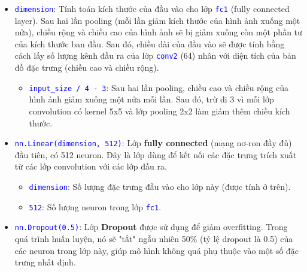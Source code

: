 \begin{itemize}
    \item \textcolor{blue}{\texttt{dimension}}: Tính toán kích thước của đầu vào cho lớp \textcolor{blue}{\texttt{fc1}} (fully connected layer). Sau hai lần pooling (mỗi lần giảm kích thước của hình ảnh xuống một nửa), chiều rộng và chiều cao của hình ảnh sẽ bị giảm xuống còn một phần tư của kích thước ban đầu. Sau đó, chiều dài của đầu vào sẽ được tính bằng cách lấy số lượng kênh đầu ra của lớp \textcolor{blue}{\texttt{conv2}} (64) nhân với diện tích của bản đồ đặc trưng (chiều cao và chiều rộng).
    
    \begin{itemize}
        \item \textcolor{blue}{\texttt{input\_size / 4 - 3}}: Sau hai lần pooling, chiều cao và chiều rộng của hình ảnh giảm xuống một nửa mỗi lần. Sau đó, trừ đi 3 vì mỗi lớp convolution có kernel 5x5 và lớp pooling 2x2 làm giảm thêm chiều kích thước.
    \end{itemize}
    
    \item \textcolor{blue}{\texttt{nn.Linear(dimension, 512)}}: Lớp \textbf{fully connected} (mạng nơ-ron đầy đủ) đầu tiên, có 512 neuron. Đây là lớp dùng để kết nối các đặc trưng trích xuất từ các lớp convolution với các lớp đầu ra.

    \begin{itemize}
        \item \textcolor{blue}{\texttt{dimension}}: Số lượng đặc trưng đầu vào cho lớp này (được tính ở trên).
        \item \textcolor{blue}{\texttt{512}}: Số lượng neuron trong lớp \textcolor{blue}{\texttt{fc1}}.
    \end{itemize}
    
    \item \textcolor{blue}{\texttt{nn.Dropout(0.5)}}: Lớp \textbf{Dropout} được sử dụng để giảm overfitting. Trong quá trình huấn luyện, nó sẽ "tắt" ngẫu nhiên 50\% (tỷ lệ dropout là 0.5) của các neuron trong lớp này, giúp mô hình không quá phụ thuộc vào một số đặc trưng nhất định.

\end{itemize}

